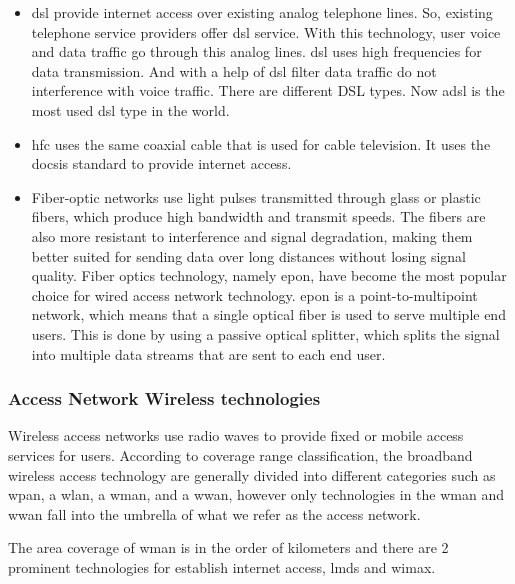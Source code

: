\begin{itemize}

    \item \ac{dsl} provide internet access over existing analog telephone lines. So, existing telephone service providers offer \ac{dsl} service. With this technology, user voice and data traffic go through this analog lines. \ac{dsl} uses high frequencies for data transmission. And with a help of \ac{dsl} filter data traffic do not interference with voice traffic.
    There are different DSL types. Now \ac{adsl} is the most used \ac{dsl} type in the world. 

    \item \ac{hfc} uses the same coaxial cable that is used for cable television. It uses the \ac{docsis} standard to provide internet access.

    \item Fiber-optic networks use light pulses transmitted through glass or plastic fibers, which produce high bandwidth and transmit speeds. 
    The fibers are also more resistant to interference and signal degradation, making them better suited for sending data over long distances without losing signal quality.
    Fiber optics technology, namely \ac{epon}, have become the most popular choice for wired access network technology. \ac{epon} is a point-to-multipoint network, which means that a single optical fiber is used to serve multiple end users. This is done by using a passive optical splitter, which splits the signal into multiple data streams that are sent to each end user.

\end{itemize}


\subsubsection{Access Network Wireless technologies}

Wireless access networks use radio waves to provide fixed or mobile access services for users. 
According to coverage range classification, the broadband wireless access technology are generally divided into different categories such as \ac{wpan}, a \ac{wlan}, a \ac{wman}, and a \ac{wwan}, however only technologies in the \ac{wman} and \ac{wwan} fall into the umbrella of what we refer as the access network.

The area coverage of \ac{wman} is in the order of kilometers and there are 2 prominent technologies for establish internet access, \ac{lmds} and \ac{wimax}.

